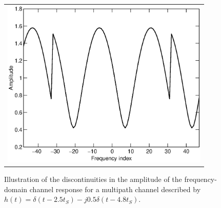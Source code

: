 \documentclass[11pt,draftnofoot,onecolumn]{IEEEtran}
\begin{document}
\begin{figure}[t]
\centering
\begin{tabular}{c}
\includegraphics[height=3.2in]{fig/fig_equivalent_ch3.eps}
\end{tabular}
\caption{Illustration of the discontinuities in the amplitude of the
frequency-domain channel response for a multipath channel described
by $h(t) = \delta(t - 2.5 t_S) - j 0.5 \delta(t - 4.8 t_S)$.}
\label{fig_siso_freq_ch}
\end{figure}
\end{document}
